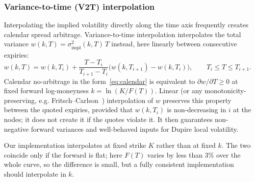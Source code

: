 \documentclass[11pt,a4paper]{article}
\theoremstyle{plain}
\theoremstyle{definition}
\begin{document}
\subsubsection{Variance-to-time (V2T) interpolation}
Interpolating the implied volatility directly along the time axis frequently creates calendar spread arbitrage. Variance-to-time interpolation interpolates the total variance $w(k,T)=\sigma_{\mathrm{impl}}^2(k,T)\,T$ instead, here linearly between consecutive expiries:
\begin{equation}
    w(k,T)=w(k,T_i)+\frac{T-T_i}{T_{i+1}-T_i}\bigl(w(k,T_{i+1})-w(k,T_i)\bigr),\qquad T_i\le T\le T_{i+1}.
\end{equation}
Calendar no-arbitrage in the form~\eqref{eq:calendar} is equivalent to $\partial w/\partial T\ge0$ at fixed forward log-moneyness $k=\ln(K/F(T))$. Linear (or any monotonicity-preserving, e.g. Fritsch--Carlson~\cite{fritsch}) interpolation of $w$ preserves this property between the quoted expiries, provided that $w(k,T_i)$ is non-decreasing in $i$ at the nodes; it does not create it if the quotes violate it. It then guarantees non-negative forward variances and well-behaved inputs for Dupire local volatility.

Our implementation interpolates at fixed strike $K$ rather than at fixed $k$. The two coincide only if the forward is flat; here $F(T)$ varies by less than $3\%$ over the whole curve, so the difference is small, but a fully consistent implementation should interpolate in $k$.
\end{document}
